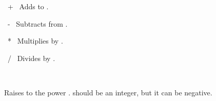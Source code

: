 \begingroup
\let\medskip\smallskip%

\begin{math-operator}{\ +\ }
	Adds  to .
	
\begin{codeexample}[post=\tt\footnotesize\pgfmathresult]
\end{codeexample}
\end{math-operator}\begin{math-operator}{\ -\ }
	Subtracts  from  .
	
\begin{codeexample}[post=\tt\footnotesize\pgfmathresult]
\end{codeexample}
\end{math-operator}
\begin{math-operator}{\ *\ }
	Multiplies  by  .
	
\begin{codeexample}[post=\tt\footnotesize\pgfmathresult]
\end{codeexample}

\end{math-operator}
\begin{math-operator}{\ /\ }
	Divides  by  .
	
\begin{codeexample}[post=\tt\footnotesize\pgfmathresult]
\end{codeexample}

\end{math-operator}
\begin{math-operator}{\ {}\ } 

Raises  to the power .  should be an integer, but it can be negative.

\begin{codeexample}[post=\tt\footnotesize\pgfmathresult]
\end{codeexample}

\begin{codeexample}[post=\tt\footnotesize\pgfmathresult]
\end{codeexample}
\end{math-operator}

